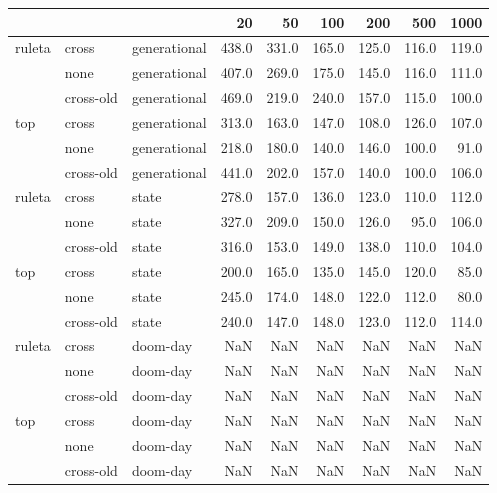\begin{tabular}{lllrrrrrr}
\toprule
    &           &          &   20   &   50   &   100  &   200  &   500  &   1000 \\
\midrule
ruleta & cross & generational &  438.0 &  331.0 &  165.0 &  125.0 &  116.0 &  119.0 \\
    & none & generational &  407.0 &  269.0 &  175.0 &  145.0 &  116.0 &  111.0 \\
    & cross-old & generational &  469.0 &  219.0 &  240.0 &  157.0 &  115.0 &  100.0 \\
top & cross & generational &  313.0 &  163.0 &  147.0 &  108.0 &  126.0 &  107.0 \\
    & none & generational &  218.0 &  180.0 &  140.0 &  146.0 &  100.0 &   91.0 \\
    & cross-old & generational &  441.0 &  202.0 &  157.0 &  140.0 &  100.0 &  106.0 \\
ruleta & cross & state &  278.0 &  157.0 &  136.0 &  123.0 &  110.0 &  112.0 \\
    & none & state &  327.0 &  209.0 &  150.0 &  126.0 &   95.0 &  106.0 \\
    & cross-old & state &  316.0 &  153.0 &  149.0 &  138.0 &  110.0 &  104.0 \\
top & cross & state &  200.0 &  165.0 &  135.0 &  145.0 &  120.0 &   85.0 \\
    & none & state &  245.0 &  174.0 &  148.0 &  122.0 &  112.0 &   80.0 \\
    & cross-old & state &  240.0 &  147.0 &  148.0 &  123.0 &  112.0 &  114.0 \\
ruleta & cross & doom-day &    NaN &    NaN &    NaN &    NaN &    NaN &    NaN \\
    & none & doom-day &    NaN &    NaN &    NaN &    NaN &    NaN &    NaN \\
    & cross-old & doom-day &    NaN &    NaN &    NaN &    NaN &    NaN &    NaN \\
top & cross & doom-day &    NaN &    NaN &    NaN &    NaN &    NaN &    NaN \\
    & none & doom-day &    NaN &    NaN &    NaN &    NaN &    NaN &    NaN \\
    & cross-old & doom-day &    NaN &    NaN &    NaN &    NaN &    NaN &    NaN \\
\bottomrule
\end{tabular}
